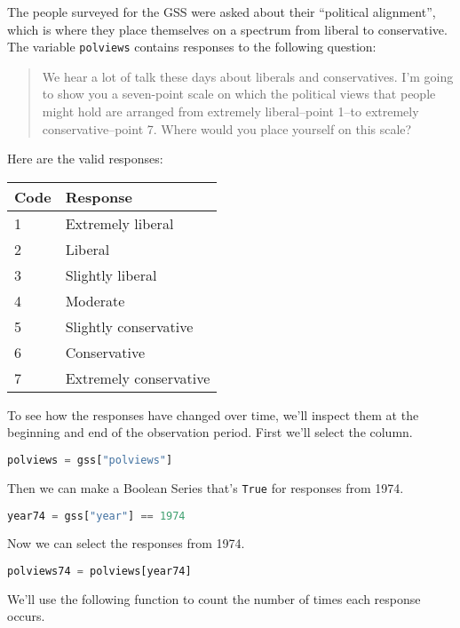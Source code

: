 The people surveyed for the GSS were asked about their ``political
alignment'', which is where they place themselves on a spectrum from
liberal to conservative. The variable \passthrough{\lstinline!polviews!}
contains responses to the following question:

\begin{quote}
We hear a lot of talk these days about liberals and conservatives. I'm
going to show you a seven-point scale on which the political views that
people might hold are arranged from extremely liberal--point 1--to
extremely conservative--point 7. Where would you place yourself on this
scale?
\end{quote}

Here are the valid responses:

\begin{longtable}[]{@{}ll@{}}
\midrule()
Code & Response \\
\midrule()
\endhead
1 & Extremely liberal \\
2 & Liberal \\
3 & Slightly liberal \\
4 & Moderate \\
5 & Slightly conservative \\
6 & Conservative \\
7 & Extremely conservative \\
\midrule()
\end{longtable}

To see how the responses have changed over time, we'll inspect them at
the beginning and end of the observation period. First we'll select the
column.

\begin{lstlisting}[language=Python,style=source]
polviews = gss["polviews"]
\end{lstlisting}

Then we can make a Boolean Series that's \passthrough{\lstinline!True!}
for responses from 1974.

\begin{lstlisting}[language=Python,style=source]
year74 = gss["year"] == 1974
\end{lstlisting}

Now we can select the responses from 1974.

\begin{lstlisting}[language=Python,style=source]
polviews74 = polviews[year74]
\end{lstlisting}

We'll use the following function to count the number of times each
response occurs.

